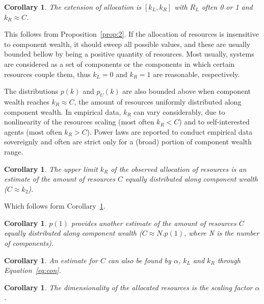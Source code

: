 \documentclass[a4paper, 11pt]{article} %
\newtheorem{corollary}[theorem2]{Corollary}
\begin{document}
 \begin{corollary}\label{cor:2}
	The extension of allocation is $[k_L,k_R]$ with $R_L$ often 0 or 1 and $k_R\approx C$.
\end{corollary}

This follows from Proposition~\ref{prop:2}.
If the allocation of resources is insensitive to component wealth,
it should sweep all possible values, and these are usually
bounded bellow by being a positive quantity of resources.
Most usually, systems are considered as a set of components
or the components in which certain resources couple them,
thus $k_L=0$ and $k_R=1$ are reasonable, respectively.

The distributions $p(k)$ and $p_U(k)$ are also
bounded above when component wealth reaches $k_R \approx C$,
the amount of resources uniformly distributed along component wealth.
In empirical data, $k_R$ can vary considerably, due to
nonlinearity of the resources scaling (most often $k_R<C$) and
to self-interested agents (most often $k_R>C$).
Power laws are reported to conduct empirical data sovereignly and
often are strict only for a
(broad) portion of component wealth range.


\begin{corollary}
	The upper limit $k_R$ of the observed allocation of resources is an estimate of the amount of resources $C$ equally distributed along component wealth ($C\approx k_2$).
\end{corollary}

Which follows form Corollary~\ref{cor:2}.

\begin{corollary}
	$p(1)$ provides another estimate of the amount of resources $C$ equally distributed along component wealth ($C\approx N . p(1)$, where N is the number of components).
\end{corollary}

\begin{corollary}
	An estimate for $C$ can also be found by $\alpha$, $k_L$ and $k_R$ through Equation~\ref{eq:con}.
\end{corollary}

\begin{corollary}
	The dimensionality of the allocated resources is the scaling factor $\alpha$.
\end{corollary}
\end{document}
